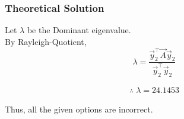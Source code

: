 \documentclass{beamer}
\begin{document}
\begin{frame}[fragile]
    \frametitle{Theoretical Solution}
Let $\lambda$ be the Dominant eigenvalue.\\

By Rayleigh-Quotient,
\begin{equation}
    \lambda = \dfrac{\vec{y}_2^\top\vec{A}\vec{y}_2}{\vec{y}_2^\top\vec{y}_2}
\end{equation}

\begin{align*}
    \boxed{\therefore \; \lambda = 24.1453}
\end{align*}

Thus, all the given options are incorrect.
\end{frame}
\end{document}
